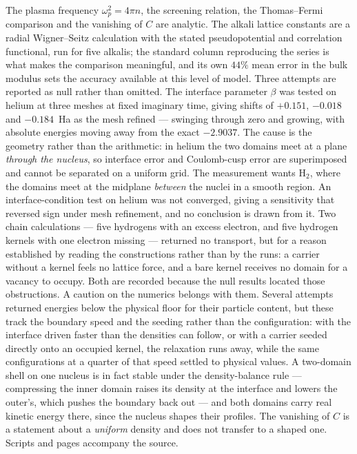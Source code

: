\documentclass[11pt]{article}
\begin{document}
The plasma frequency $\omega_p^2=4\pi n$, the screening relation, the Thomas--Fermi comparison and
the vanishing of $C$ are analytic. The alkali lattice constants are a radial Wigner--Seitz
calculation with the stated pseudopotential and correlation functional, run for five alkalis; the
standard column reproducing the
series is what makes the comparison meaningful, and its own $44\%$ mean error in the bulk modulus
sets the accuracy available at this level of model. Three attempts are reported as null rather than omitted. The interface parameter
$\beta$ was tested on helium at three meshes at fixed imaginary time, giving shifts of $+0.151$,
$-0.018$ and $-0.184$~Ha as the mesh refined --- swinging through zero and growing, with absolute
energies moving away from the exact $-2.9037$. The cause is the geometry rather than the arithmetic:
in helium the two domains meet at a plane \emph{through the nucleus}, so interface error and
Coulomb-cusp error are superimposed and cannot be separated on a uniform grid. The measurement wants
$\mathrm{H_2}$, where the domains meet at the midplane \emph{between} the nuclei in a smooth
region. An interface-condition test on helium was
not converged, giving a sensitivity that reversed sign under mesh refinement, and no conclusion is
drawn from it. Two chain calculations --- five hydrogens with an excess electron, and five hydrogen
kernels with one electron missing --- returned no transport, but for a reason established by reading
the constructions rather than by the runs: a carrier without a kernel feels no lattice force, and a
bare kernel receives no domain for a vacancy to occupy. Both are recorded because the null results
located those obstructions. A caution on the numerics belongs with them. Several attempts returned
energies below the physical floor for their particle content, but these track the boundary speed and
the seeding rather than the configuration: with the interface driven faster than the densities can
follow, or with a carrier seeded directly onto an occupied kernel, the relaxation runs away, while the
same configurations at a quarter of that speed settled to physical values. A two-domain shell on one
nucleus is in fact stable under the density-balance rule --- compressing the inner domain raises its
density at the interface and lowers the outer's, which pushes the boundary back out --- and both
domains carry real kinetic energy there, since the nucleus shapes their profiles. The vanishing of
$C$ is a statement about a \emph{uniform} density and does not transfer to a shaped one. Scripts and pages accompany the source.
\end{document}
